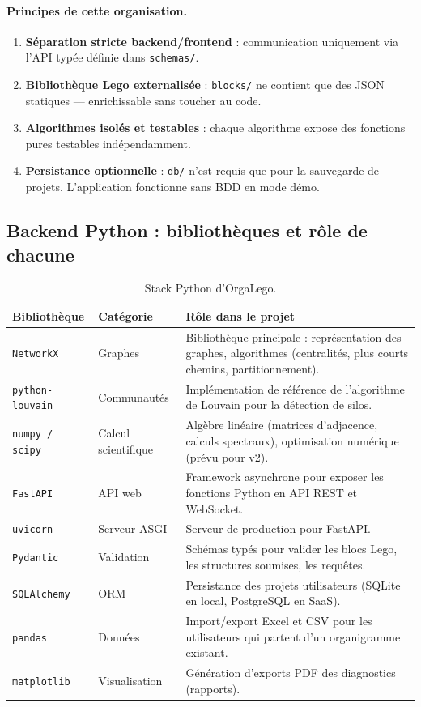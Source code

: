 \documentclass[11pt,a4paper]{article}
\begin{document}
\paragraph{Principes de cette organisation.}

\begin{enumerate}[leftmargin=*]
    \item \textbf{Séparation stricte backend/frontend} : communication uniquement via l'API typée définie dans \texttt{schemas/}.
    \item \textbf{Bibliothèque Lego externalisée} : \texttt{blocks/} ne contient que des JSON statiques --- enrichissable sans toucher au code.
    \item \textbf{Algorithmes isolés et testables} : chaque algorithme expose des fonctions pures testables indépendamment.
    \item \textbf{Persistance optionnelle} : \texttt{db/} n'est requis que pour la sauvegarde de projets. L'application fonctionne sans BDD en mode démo.
\end{enumerate}

\subsection{Backend Python : bibliothèques et rôle de chacune}

\begin{table}[h]
\centering
\small
\begin{tabular}{p{3.2cm} p{3cm} p{8cm}}
\toprule
\textbf{Bibliothèque} & \textbf{Catégorie} & \textbf{Rôle dans le projet} \\
\midrule
\texttt{NetworkX} & Graphes & Bibliothèque principale : représentation des graphes, algorithmes (centralités, plus courts chemins, partitionnement). \\
\texttt{python-louvain} & Communautés & Implémentation de référence de l'algorithme de Louvain pour la détection de silos. \\
\texttt{numpy / scipy} & Calcul scientifique & Algèbre linéaire (matrices d'adjacence, calculs spectraux), optimisation numérique (prévu pour v2). \\
\texttt{FastAPI} & API web & Framework asynchrone pour exposer les fonctions Python en API REST et WebSocket. \\
\texttt{uvicorn} & Serveur ASGI & Serveur de production pour FastAPI. \\
\texttt{Pydantic} & Validation & Schémas typés pour valider les blocs Lego, les structures soumises, les requêtes. \\
\texttt{SQLAlchemy} & ORM & Persistance des projets utilisateurs (SQLite en local, PostgreSQL en SaaS). \\
\texttt{pandas} & Données & Import/export Excel et CSV pour les utilisateurs qui partent d'un organigramme existant. \\
\texttt{matplotlib} & Visualisation & Génération d'exports PDF des diagnostics (rapports). \\
\bottomrule
\end{tabular}
\caption{Stack Python d'OrgaLego.}
\end{table}
\end{document}
